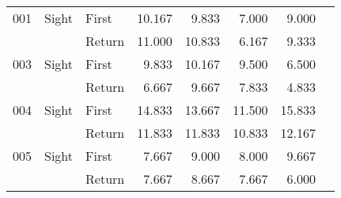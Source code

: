 \begin{table}[!htb]
\begin{tabular}{lllrrrrr}
001 & Sight & First & 10.167 &                                                 9.833 &                                                  7.000 &   9.000 \\
    &       & Return & 11.000 &                                                10.833 &                                                  6.167 &   9.333 \\
003 & Sight & First &  9.833 &                                                10.167 &                                                  9.500 &   6.500 \\
    &       & Return &  6.667 &                                                 9.667 &                                                  7.833 &   4.833 \\
004 & Sight & First & 14.833 &                                                13.667 &                                                 11.500 &  15.833 \\
    &       & Return & 11.833 &                                                11.833 &                                                 10.833 &  12.167 \\
005 & Sight & First &  7.667 &                                                 9.000 &                                                  8.000 &   9.667 \\
    &       & Return &  7.667 &                                                 8.667 &                                                  7.667 &   6.000 \\
\bottomrule
\end{tabular}
\end{table}

